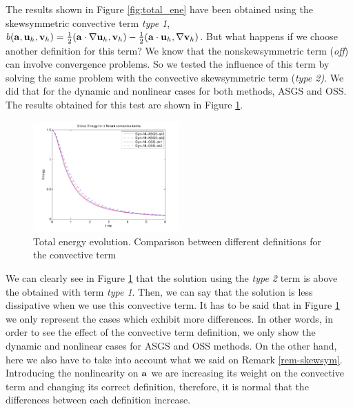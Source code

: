 \begin{remark}
\label{rem-C4_ene_skew2}
The results shown in Figure \ref{fig:total_ene} have been obtained using the skewsymmetric convective term \textit{type 1}, $b({\bf a},{\bf u}_h,{\bf v}_h)=\frac{1}{2}({\bf a}\cdot\nabla{\bf u}_h,{\bf v}_h)-\frac{1}{2}(\mathbf{a}\cdot{\bf u}_h,\nabla{\bf v}_h)$. But what happens if we choose another definition for this term? We know that the nonskewsymmetric term (\textit{off}) can involve convergence problems. So we tested the influence of this term by solving the same problem with the convective skewsymmetric term (\textit{type 2)}. We did that for the dynamic and nonlinear cases for both methods, ASGS and OSS. The results obtained for this test are shown in Figure \ref{fig:ene_skew}.
\begin{figure}[h!]
	\centering	
	\includegraphics[width=0.5\textwidth]{Figures/Chapter4/DHIT/ene_skew_scaled}
	\caption{Total energy evolution. Comparison between different definitions for the convective term}
	\label{fig:ene_skew}
\end{figure}

We can clearly see in Figure \ref{fig:ene_skew} that the solution using the \textit{type 2} term is above the obtained with term \textit{type 1}. Then, we can say that the solution is less dissipative when we use this convective term. It has to be said that in Figure \ref{fig:ene_skew} we only represent the cases which exhibit more differences. In other words, in order to see the effect of the convective term definition, we only show the dynamic and nonlinear cases for ASGS and OSS methods. On the other hand, here we also have to take into account what we said on Remark \ref{rem-skewsym}. Introducing the nonlinearity on ${\bf a}$ we are increasing its weight on the convective term and changing its correct definition, therefore, it is normal that the differences between each definition increase.
\end{remark}

